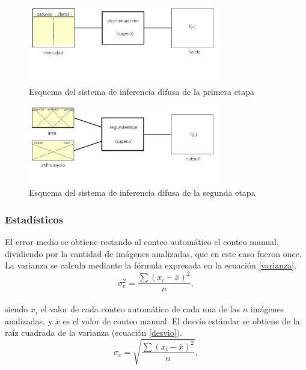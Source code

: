 \begin{figure}[h!]
    \centering
    \includegraphics[width=0.75\textwidth]{Imagenes/Homomorfico/sugeno1.png}
     \hfill
     \caption{Esquema del sistema de inferencia difusa de la primera etapa}
    \label{sug1}
\end{figure}
\begin{figure}[h!]
    \centering
    \includegraphics[width=0.75\textwidth]{Imagenes/Homomorfico/sugeno2.png}
     \hfill
     \caption{Esquema del sistema de inferencia difusa de la segunda etapa}
    \label{sug2}
\end{figure}

\subsubsection{Estadísticos} 
El error medio se obtiene restando al conteo automático el conteo manual, dividiendo por la cantidad de imágenes analizadas, que en este caso fueron once.
La varianza se calcula mediante la fórmula expresada en la ecuación \ref{varianza}.
\\
\begin{equation}
	\sigma_{e} ^2=\frac{\sum (x_{i}-\overline{x})^2}{n},\label{varianza}
\end{equation}
\\
siendo $x_i$ el valor de cada conteo automático de cada una de las $n$ imágenes analizadas, y $\overline{x}$ es el valor de conteo manual.
El desvío estándar se obtiene de la raíz cuadrada de la varianza (ecuación \ref{desvio}).
\\
\begin{equation}
	\sigma_{e}=\sqrt{\frac{\sum (x_{i}-\overline{x})^2}{n}},\label{desvio}
\end{equation}
\\
